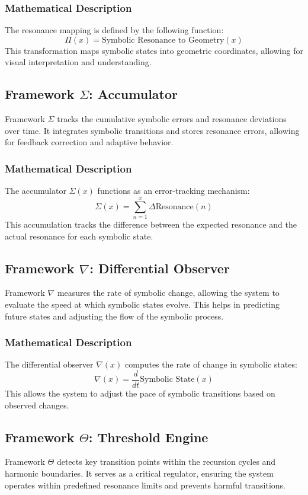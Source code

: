 \documentclass[12pt]{article}
\begin{document}
\subsubsection{Mathematical Description}
The resonance mapping is defined by the following function:
\[
\Pi(x) = \text{Symbolic Resonance to Geometry}(x)
\]
This transformation maps symbolic states into geometric coordinates, allowing for visual interpretation and understanding.

\subsection{Framework $\Sigma$: Accumulator}
Framework $\Sigma$ tracks the cumulative symbolic errors and resonance deviations over time. It integrates symbolic transitions and stores resonance errors, allowing for feedback correction and adaptive behavior.

\subsubsection{Mathematical Description}
The accumulator $\Sigma(x)$ functions as an error-tracking mechanism:
\[
\Sigma(x) = \sum_{n=1}^{x} \Delta \text{Resonance}(n)
\]
This accumulation tracks the difference between the expected resonance and the actual resonance for each symbolic state.

\subsection{Framework $\nabla$: Differential Observer}
Framework $\nabla$ measures the rate of symbolic change, allowing the system to evaluate the speed at which symbolic states evolve. This helps in predicting future states and adjusting the flow of the symbolic process.

\subsubsection{Mathematical Description}
The differential observer $\nabla(x)$ computes the rate of change in symbolic states:
\[
\nabla(x) = \frac{d}{dt} \text{Symbolic State}(x)
\]
This allows the system to adjust the pace of symbolic transitions based on observed changes.

\subsection{Framework $\Theta$: Threshold Engine}
Framework $\Theta$ detects key transition points within the recursion cycles and harmonic boundaries. It serves as a critical regulator, ensuring the system operates within predefined resonance limits and prevents harmful transitions.
\end{document}
